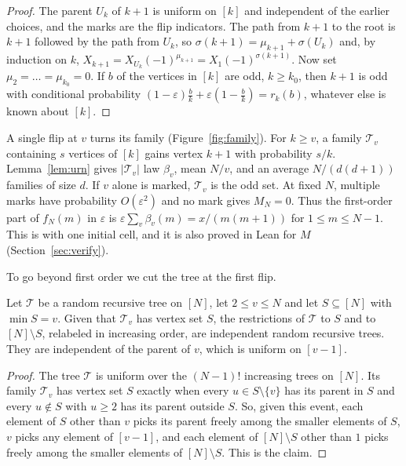 \begin{proof}
The parent $U_k$ of $k+1$ is uniform on $[k]$ and independent of the earlier
choices, and the marks are the flip indicators. The path from $k+1$ to the
root is $k+1$ followed by the path from $U_k$, so
$\sigma(k+1)=\mu_{k+1}+\sigma(U_k)$ and, by induction on $k$,
$X_{k+1}=X_{U_k}(-1)^{\mu_{k+1}}=X_1(-1)^{\sigma(k+1)}$. Now set
$\mu_2=\dots=\mu_{k_0}=0$. If $b$ of the vertices in $[k]$ are odd, $k\ge k_0$,
then $k+1$ is odd with conditional probability $(1-\varepsilon)\frac
bk+\varepsilon(1-\frac bk)=r_k(b)$, whatever else is known about $[k]$.
\end{proof}

A single flip at $v$ turns its family (Figure~\ref{fig:family}). For
$k\ge v$, a family $\mathcal T_v$ containing $s$ vertices of $[k]$
gains vertex $k+1$ with probability $s/k$. Lemma~\ref{lem:urn} gives
$\lvert\mathcal T_v\rvert$ law $\beta_v$, mean $N/v$, and an average
$N/(d(d+1))$ families of size $d$. If $v$ alone is marked,
$\mathcal T_v$ is the odd set. At fixed $N$, multiple marks have
probability $O(\varepsilon^2)$ and no mark gives $M_N=0$. Thus the
first-order part of $f_N(m)$ in $\varepsilon$ is
$\varepsilon\sum_v\beta_v(m)=x/(m(m+1))$ for $1\le m\le N-1$. This is \cite[Eq.~(10)]{bhs2023} with one
initial cell, and it is also proved in Lean for $M$
(Section~\ref{sec:verify}).

To go beyond first order we cut the tree at the first flip.

\begin{lemma}\label{lem:split}
Let $\mathcal T$ be a random recursive tree on $[N]$, let $2\le v\le N$ and
let $S\subseteq[N]$ with $\min S=v$. Given that $\mathcal T_v$ has vertex set
$S$, the restrictions of $\mathcal T$ to $S$ and to $[N]\setminus S$,
relabeled in increasing order, are independent random recursive trees. They
are independent of the parent of $v$, which is uniform on $[v-1]$.
\end{lemma}

\begin{proof}
The tree $\mathcal T$ is uniform over the $(N-1)!$ increasing trees on $[N]$.
Its family $\mathcal T_v$ has vertex set $S$ exactly when every $u\in
S\setminus\{v\}$ has its parent in $S$ and every $u\notin S$ with $u\ge2$ has
its parent outside $S$. So, given this event, each element of $S$ other than
$v$ picks its parent freely among the smaller elements of $S$, $v$ picks any
element of $[v-1]$, and each element of $[N]\setminus S$ other than $1$ picks
freely among the smaller elements of $[N]\setminus S$. This is the claim.
\end{proof}

